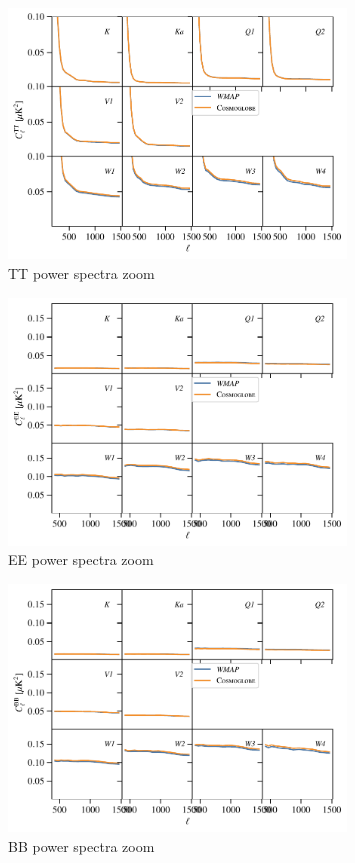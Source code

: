 \documentclass[twocolumn]{../../common/aa}
\begin{document}
\begin{figure}
	\centering
	\includegraphics[width=0.8\textwidth]{figures/TT_spectra_zoom.pdf}
	\caption{TT power spectra zoom}
\end{figure}
\begin{figure}
	\centering
	\includegraphics[width=0.8\textwidth]{figures/EE_spectra_zoom.pdf}
	\caption{EE power spectra zoom}
\end{figure}
\begin{figure}
	\centering
	\includegraphics[width=0.8\textwidth]{figures/BB_spectra_zoom.pdf}
	\caption{BB power spectra zoom}
\end{figure}
\end{document}
